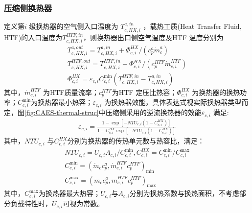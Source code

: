 \subsubsection{压缩侧换热器}
定义第$i$ 级换热器的空气侧入口温度为 $T_{c,HX,i}^{a,in}$ ，载热工质(Heat Transfer Fluid, HTF)的入口温度为$T_{c,HX,i}^{HTF,in}$，则换热器出口侧空气温度及HTF 温度分别为\cite{CAES-Wind-Rui-19}
\begin{subequations}
\label{eq:he-comp-temp-out}
\begin{gather}
T_{c,HX,i}^{a,out} = T_{c,HX,i}^{a,in} + \Phi _{c,i}^{HX}/({c_p^a\dot m_c^a}) \label{equ:he-comp-temp-air-out} \\
T_{c,HX,i}^{HTF,out} = T_{c,HX,i}^{HTF,in} - \Phi _{c,i}^{HX}/({c_p^{HTF}\dot m_{c,i}^{HTF}}) \label{equ:he-comp-temp-HTF-out}\\
\Phi _{c,i}^{HX} = {\varepsilon _{c,i}}C_{c,i}^{\min }({T_{c,HX,i}^{HTF,in} - T_{c,HX,i}^{a,in}})\label{equ:he-comp-thermal}
\end{gather}
\end{subequations}
其中，$\dot m_{c,i}^{HTF}$ 为HTF质量流率；$c_p^{HTF}$为HTF 定压比热容；$\Phi _{c,i}^{HX}$ 为换热器的换热功率；$C_{c,i}^{\min}$为换热器最小热容；${\varepsilon _{c,i}}$ 为换热器效能，具体表达式视实际换热器类型而定，图\ref{fig:CAES-thermal-struc}中压缩侧采用的逆流换热器的效能${\varepsilon _{c,i}}$ 满足\cite{Heat-mass-transfer-11}:
\begin{subequations}
\begin{gather}
{\varepsilon _{c,i}} = \frac{{1 - \exp [{ - NT{U_{c,i}}({1 - C_{c,i}^{HX}})}]}}{{1 - C_{c,i}^{HX}\exp [{ - NT{U_{c,i}}({1 - C_{c,i}^{HX}})}]}}\label{equ:he-comp-eff-1}
\end{gather}
\end{subequations}
其中，$NT{U_{c,i}}$ 与$C_{c,i}^{HX}$分别为换热器的传热单元数与热容比，满足\cite{Heat-mass-transfer-11}：
\begin{subequations}
\begin{gather}
NT{U_{c,i}} = U_{c,i}A_{c,i}/C_{c,i}^{\min }, C_{c,i}^{HX} = C_{c,i}^{\min }/C_{c,i}^{\max }\label{equ:he-comp-NTU-C}\\
C_{c,i}^{\min } = {({{{\dot m}_c}c_p^a,\dot m_{c,i}^{HTF}c_p^{HTF}})_{\min }}\label{equ:he-comp-Cmin}\\
C_{c,i}^{\max } = {({{{\dot m}_c}c_p^a,\dot m_{c,i}^{HTF}c_p^{HTF}})_{\max }}\label{equ:he-comp-Cmax}
\end{gather}
\end{subequations}
其中，$C_{c,i}^{\max }$为换热器最大热容；$U_{c,i}$与$A_{c,i}$分别为换热系数与换热面积，不考虑部分负载特性时，$U_{c,i}$可视为常数。

